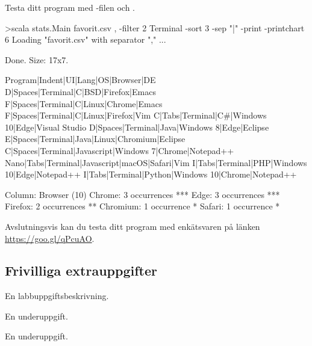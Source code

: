 \Subtask Testa ditt program med -filen och .
\begin{REPLnonum}
>scala stats.Main favorit.csv , -filter 2 Terminal -sort 3 -sep "|" -print -printchart 6
Loading "favorit.csv" with separator "," ...

Done. Size: 17x7.

Program|Indent|UI|Lang|OS|Browser|DE
D|Spaces|Terminal|C|BSD|Firefox|Emacs
F|Spaces|Terminal|C|Linux|Chrome|Emacs
F|Spaces|Terminal|C|Linux|Firefox|Vim
C|Tabs|Terminal|C#|Windows 10|Edge|Visual Studio
D|Spaces|Terminal|Java|Windows 8|Edge|Eclipse
E|Spaces|Terminal|Java|Linux|Chromium|Eclipse
C|Spaces|Terminal|Javascript|Windows 7|Chrome|Notepad++
Nano|Tabs|Terminal|Javascript|macOS|Safari|Vim
I|Tabs|Terminal|PHP|Windows 10|Edge|Notepad++
I|Tabs|Terminal|Python|Windows 10|Chrome|Notepad++

Column: Browser (10)
Chrome: 3 occurrences
***
Edge: 3 occurrences
***
Firefox: 2 occurrences
**
Chromium: 1 occurrence
*
Safari: 1 occurrence
*

\end{REPLnonum}

\Task Avslutningsvis kan du testa ditt program med enkätsvaren på länken 
\url{https://goo.gl/qPcuAO}.

\subsection{Frivilliga extrauppgifter}
    
\Task En labbuppgiftsbeskrivning. \TODO

\Subtask En underuppgift.

\Subtask En underuppgift.
